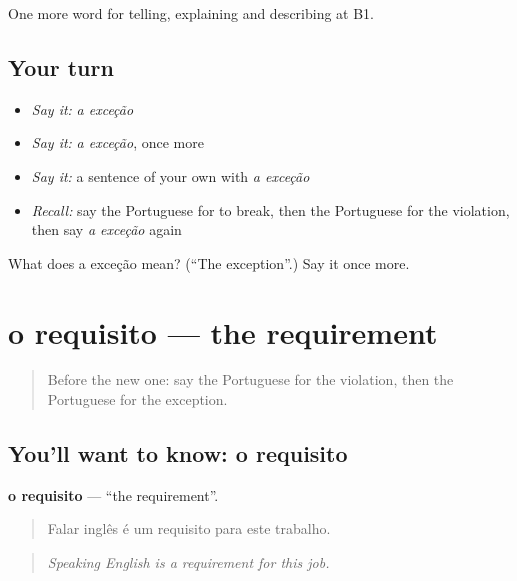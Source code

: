 \begin{grammarlens}[title={What you've built}]
One more word for telling, explaining and describing at B1.
\end{grammarlens}

\subsection*{Your turn}
\begin{itemize}
\raggedright
  \item \emph{Say it:} \emph{a exceção}
  \item \emph{Say it:} \emph{a exceção}, once more
  \item \emph{Say it:} a sentence of your own with \emph{a exceção}
  \item \emph{Recall:} say the Portuguese for to break, then the Portuguese for the violation, then say \emph{a exceção} again
\end{itemize}

\begin{tcolorbox}[breakable,colback=teal!4,colframe=teal!35!black,title={Before you move on}]
What does a exceção mean? (\textquotedblleft{}The exception\textquotedblright{}.) Say it once more.
\end{tcolorbox}
\section[o requisito]{o requisito — the requirement}

\label{lesson:PT-C383-requisito}



\begin{quote}
Before the new one: say the Portuguese for the violation, then the Portuguese for the exception.
\end{quote}

\subsection*{You'll want to know: o requisito}
\textbf{o requisito} — \textquotedblleft{}the requirement\textquotedblright{}.

\begin{quote}
Falar inglês é um requisito para este trabalho.
\end{quote}

\begin{quote}
\emph{Speaking English is a requirement for this job.}
\end{quote}

